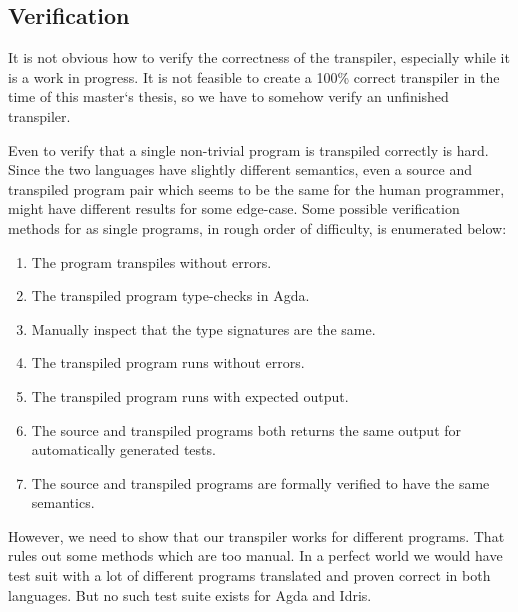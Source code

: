 \documentclass[parskip=half]{scrartcl}
\begin{document}


\subsection{Verification}
It is not obvious how to verify the correctness of the transpiler, especially
while it is a work in progress. It is not feasible to create a 100\% correct
transpiler in the time of this master`s thesis, so we have to somehow verify an
unfinished transpiler.

Even to verify that a single non-trivial program is transpiled correctly is
hard. Since the two languages have slightly different semantics, even a source
and transpiled program pair which seems to be the same for the human
programmer, might have different results for some edge-case. Some possible
verification methods for as single programs, in rough order of difficulty, is
enumerated below:

\begin{enumerate}
\item The program transpiles without errors.
\item The transpiled program type-checks in Agda.
\item Manually inspect that the type signatures are the same.
\item The transpiled program runs without errors.
\item The transpiled program runs with expected output.
\item The source and transpiled programs both returns the same output for
  automatically generated tests.
\item The source and transpiled programs are formally verified to have the same
  semantics.
\end{enumerate}


However, we need to show that our transpiler works for different programs.
That rules out some methods which are too manual.  In a perfect world we would
have test suit with a lot of different programs translated and proven correct in
both languages. But no such test suite exists for Agda and Idris.

\end{document}
